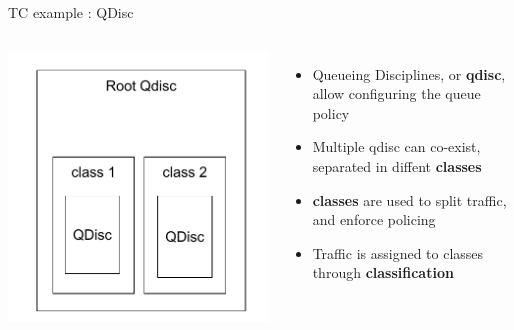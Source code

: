 \begin{frame}{TC example : QDisc}
	\begin{columns}
		\includegraphics[width=\textwidth]{slides/networking-traffic-control/tc-qdisc.pdf}
		\begin{itemize}
			\item Queueing Disciplines, or \textbf{qdisc}, allow configuring the queue policy
			\item Multiple qdisc can co-exist, separated in diffent \textbf{classes}
			\item \textbf{classes} are used to split traffic, and enforce policing
			\item Traffic is assigned to classes through \textbf{classification}
		\end{itemize}
	\end{columns}
\end{frame}

